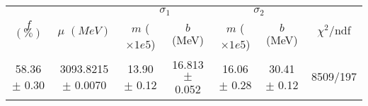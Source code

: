 \begin{tabular}{c|c|cc|cc||c}
 \multirow{2}{*}{$f$ $(\%)$} & \multirow{2}{*}{$\mu$ $(MeV)$} & \multicolumn{2}{|c|}{$\sigma_1$} & \multicolumn{2}{|c||}{$\sigma_2$} & \multirow{2}{*}{$\chi^2/$ndf} \\
 & & $m$ ($\times1e5$) & $b$ (MeV) & $m$ ($\times1e5$) & $b$ (MeV) & \\
\hline
58.36 $\pm$ 0.30 & 3093.8215 $\pm$ 0.0070 & 13.90 $\pm$ 0.12 & 16.813 $\pm$ 0.052 & 16.06 $\pm$ 0.28 & 30.41 $\pm$ 0.12 & 8509/197\\
\end{tabular}
